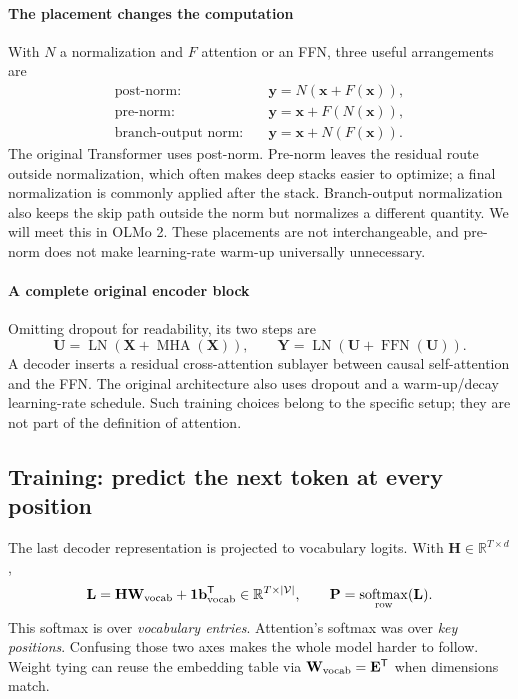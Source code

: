 \documentclass[11pt, oneside]{book}
\newcommand{\R}{\mathbb{R}}
\newcommand{\T}{^{\mathsf{T}}}           %
\DeclareMathOperator{\softmax}{softmax}
\let\originalsubsection\subsection
\renewcommand{\subsection}{\Needspace{6\baselineskip}\originalsubsection}
\begin{document}
\paragraph{The placement changes the computation} With $N$ a normalization and $F$ attention or an FFN, three useful arrangements are
\begin{align*}
 \text{post-norm:}\quad&\mathbf{y}=N(\mathbf{x}+F(\mathbf{x})),\\
 \text{pre-norm:}\quad&\mathbf{y}=\mathbf{x}+F(N(\mathbf{x})),\\
 \text{branch-output norm:}\quad&\mathbf{y}=\mathbf{x}+N(F(\mathbf{x})).
\end{align*}
The original Transformer uses post-norm. Pre-norm leaves the residual route outside normalization, which often makes deep stacks easier to optimize; a final normalization is commonly applied after the stack. Branch-output normalization also keeps the skip path outside the norm but normalizes a different quantity. We will meet this in OLMo 2. These placements are not interchangeable, and pre-norm does not make learning-rate warm-up universally unnecessary.

\paragraph{A complete original encoder block} Omitting dropout for readability, its two steps are
\[
 \mathbf{U}=\operatorname{LN}(\mathbf{X}+\operatorname{MHA}(\mathbf{X})),\qquad
 \mathbf{Y}=\operatorname{LN}(\mathbf{U}+\operatorname{FFN}(\mathbf{U})).
\]
A decoder inserts a residual cross-attention sublayer between causal self-attention and the FFN. The original architecture also uses dropout and a warm-up/decay learning-rate schedule. Such training choices belong to the specific setup; they are not part of the definition of attention.

\subsection*{Training: predict the next token at every position}
The last decoder representation is projected to vocabulary logits. With $\mathbf{H}\in\R^{T\times d}$,
\[
 \mathbf{L}=\mathbf{H}\mathbf{W}_{\rm vocab}+\mathbf{1}\mathbf{b}_{\rm vocab}\T
 \in\R^{T\times|\mathcal{V}|},\qquad
 \mathbf{P}=\softmax_{\rm row}(\mathbf{L}).
\]
This softmax is over \emph{vocabulary entries}. Attention's softmax was over \emph{key positions}. Confusing those two axes makes the whole model harder to follow. Weight tying can reuse the embedding table via $\mathbf{W}_{\rm vocab}=\mathbf{E}\T$ when dimensions match.
\end{document}
